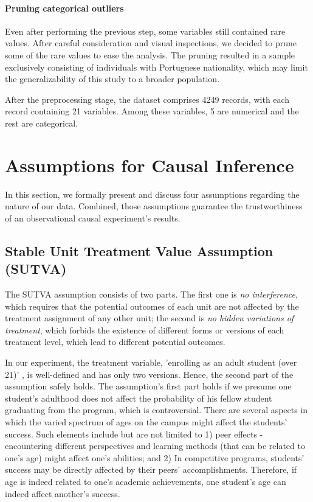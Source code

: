 \documentclass[11pt]{article}
\newcommand{\todo}[1]{{\color{orange}{TODO: #1}}}
\newcommand{\gur}[1]{{\color{teal}{Gur: #1}}}
\begin{document}
\paragraph{Pruning categorical outliers} Even after performing the previous step, some variables still contained rare values. After careful consideration and visual inspections, we decided to prune some of the rare values to ease the analysis. The pruning resulted in a sample exclusively consisting of individuals with Portuguese nationality, which may limit the generalizability of this study to a broader population. 

\todo{scaling and encoding - I think that it can come later on in the analysis part, but don't forget!}

After the preprocessing stage, the dataset comprises 4249 records, with each record containing 21 variables. Among these variables, 5 are numerical and the rest are categorical.


\section{Assumptions for Causal Inference}

In this section, we formally present and discuss four assumptions regarding the nature of our data. Combined, those assumptions guarantee the trustworthiness of an observational causal experiment's results.

\subsection{Stable Unit Treatment Value Assumption (SUTVA)}

The SUTVA assumption consists of two parts. The first one is \emph{no interference}, which requires that the potential outcomes of each unit are not affected by the treatment assignment of any other unit; the second is \emph{no hidden variations of treatment}, which forbids the existence of different forms or versions of each treatment level, which lead to different potential outcomes.

In our experiment, the treatment variable, 'enrolling as an adult student (over 21)' \gur{is it?}, is well-defined and has only two versions. Hence, the second part of the assumption safely holds. The assumption's first part holds if we presume one student's adulthood does not affect the probability of his fellow student graduating from the program, which is controversial. There are several aspects in which the varied spectrum of ages on the campus might affect the students' success. Such elements include but are not limited to 1) peer effects - encountering different perspectives and learning methods (that can be related to one's age) might affect one's abilities; and 2) In competitive programs, students' success may be directly affected by their peers' accomplishments. Therefore, if age is indeed related to one's academic achievements, one student's age can indeed affect another's success.
\end{document}
